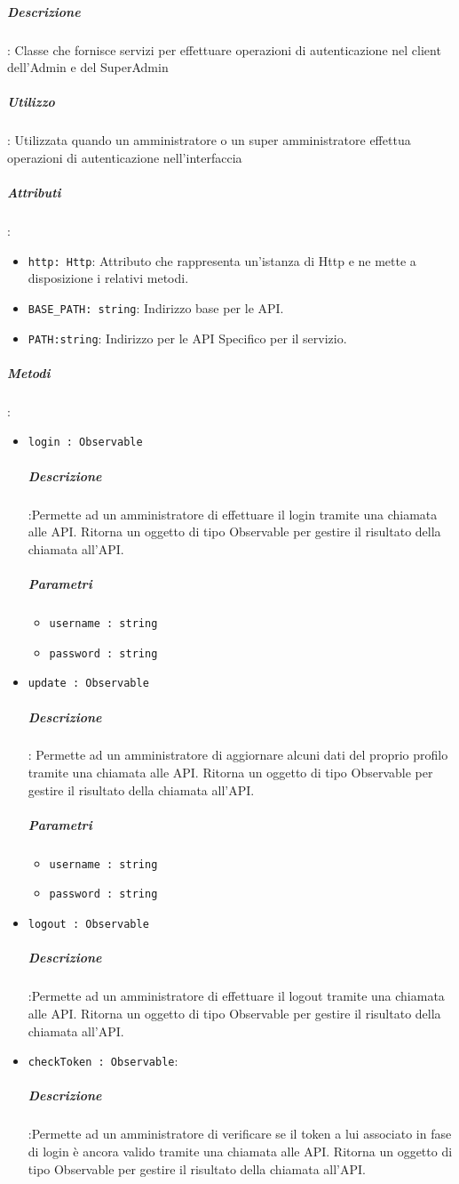 \documentclass[../DefinizioneDiProdotto_v3.0.0.tex]{subfiles}
\begin{document}
				\subparagraph{Descrizione}: Classe che fornisce servizi per effettuare operazioni di autenticazione nel client dell'Admin e del SuperAdmin
				\subparagraph{Utilizzo}: Utilizzata quando un amministratore o un super amministratore effettua operazioni di autenticazione nell'interfaccia
				\subparagraph{Attributi}:
				\begin{itemize}
					\item \texttt{http: Http}: Attributo che rappresenta un'istanza di Http e ne mette a disposizione i relativi metodi.
					\item \texttt{BASE\_PATH: string}: Indirizzo base per le API.
					\item \texttt{PATH:string}: Indirizzo per le API Specifico per il servizio.
				\end{itemize}
				\subparagraph{Metodi}:
				\begin{itemize}
					\item \texttt{login : Observable}
					\subparagraph{Descrizione}:Permette ad un amministratore di effettuare il login tramite una chiamata alle API. Ritorna un oggetto di tipo Observable per gestire il risultato della chiamata all'API.
					\subparagraph{Parametri}\begin{itemize}
						\item \texttt{username : string}
						\item \texttt{password : string}
					\end{itemize}

					\item \texttt{update : Observable}
					\subparagraph{Descrizione}: Permette ad un amministratore di aggiornare alcuni dati del proprio profilo tramite una chiamata alle API. Ritorna un oggetto di tipo Observable per gestire il risultato della chiamata all'API.
					\subparagraph{Parametri}\begin{itemize}
						\item \texttt{username : string}
						\item \texttt{password : string}
					\end{itemize}
					\item \texttt{logout : Observable}
					\subparagraph{Descrizione}:Permette ad un amministratore di effettuare il logout tramite una chiamata alle API. Ritorna un oggetto di tipo Observable per gestire il risultato della chiamata all'API.

					\item \texttt{checkToken : Observable}:
					\subparagraph{Descrizione}:Permette ad un amministratore di verificare se il token a lui associato in fase di login è ancora valido tramite una chiamata alle API. Ritorna un oggetto di tipo Observable per gestire il risultato della chiamata all'API.
				\end{itemize}
\end{document}
